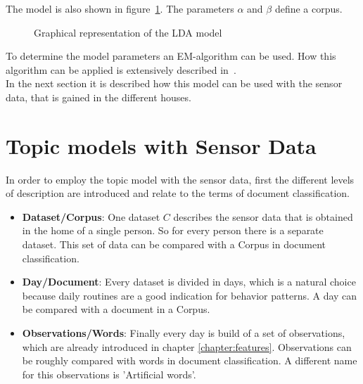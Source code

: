 The model is also shown in figure~\ref{fig:modelBasic}. The parameters $\alpha$ and $\beta$ define a corpus.

\begin{figure}[h!]
\centering
\def\svgwidth{400pt}

\caption{Graphical representation of the LDA model}
\label{fig:modelBasic}
\end{figure}

To determine the model parameters an EM-algorithm can be used. How this algorithm can be applied is extensively described in~\cite{blei2003latent}. \\
In the next section it is described how this model can be used with the sensor data, that is gained in the different houses.


\section{Topic models with Sensor Data}

In order to employ the topic model with the sensor data, first the different levels of description are introduced and relate to the terms of document classification.
\begin{itemize}
 \item \textbf{Dataset/Corpus}: One dataset $C$ describes the sensor data that is obtained in the home of a single person. So for every person there is a separate dataset. This set of data can be compared with a Corpus in document classification.
 \item \textbf{Day/Document}: Every dataset is divided in days, which is a natural choice because daily routines are a good indication for behavior patterns. A day can be compared with a document in a Corpus.
 \item \textbf{Observations/Words}: Finally every day is build of a set of observations, which are already introduced in chapter \ref{chapter:features}. Observations can be roughly compared with words in document classification. A different name for this observations is  'Artificial words'.
\end{itemize}

